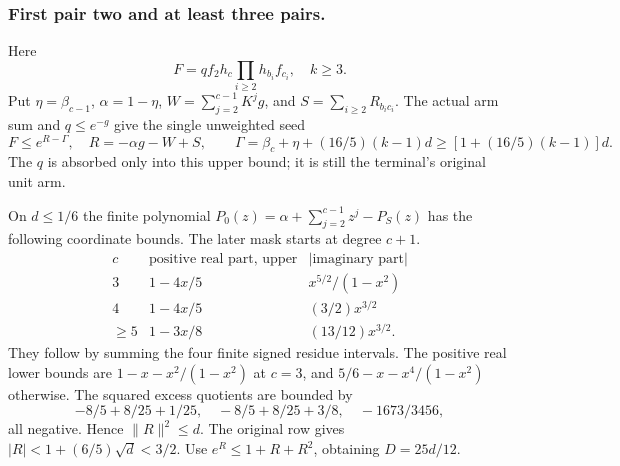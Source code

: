 \subsubsection{First pair two and at least three pairs.}\label{part:unit-p:two-many}
Here
\[
 F=qf_2h_c\prod_{i\ge2}h_{b_i}f_{c_i},\quad k\ge3.
\]
Put \(\eta=\beta_{c-1}\), \(\alpha=1-\eta\),
\(W=\sum_{j=2}^{c-1}K^jg\), and \(S=\sum_{i\ge2}R_{b_ic_i}\).
The actual arm sum and \(q\le e^{-g}\) give the single unweighted seed
\begin{equation}\label{eq:unit-p:data-18}
F\le e^{R-\Gamma},\quad R=-\alpha g-W+S,\qquad
 \Gamma=\beta_c+\eta+(16/5)(k-1)d
        \ge[1+(16/5)(k-1)]d .
\end{equation}
The \(q\) is absorbed only into this upper bound; it is still the
terminal's original unit arm.

On \(d\le1/6\) the finite polynomial
\(P_0(z)=\alpha+\sum_{j=2}^{c-1}z^j-P_S(z)\)
has the following coordinate bounds. The later mask starts at
degree \(c+1\).
\begin{equation}\label{eq:unit-p:data-19}
\begin{array}{c|c|c}
 c&\text{positive real part, upper}&
                    |\text{imaginary part}|\\\hline
 3&1-4x/5&x^{5/2}/(1-x^2)\\
 4&1-4x/5&(3/2)x^{3/2}\\
 \ge5&1-3x/8&(13/12)x^{3/2}.
\end{array}
\end{equation}
They follow by summing the four finite signed residue intervals.
The positive real lower bounds are
\(1-x-x^2/(1-x^2)\) at \(c=3\), and
\(5/6-x-x^4/(1-x^2)\) otherwise. The squared excess quotients
are bounded by
\[
 -8/5+8/25+1/25,\quad
 -8/5+8/25+3/8,\quad -1673/3456 ,
\]
all negative. Hence \(\|R\|^2\le d\).
The original row gives
\(|R|<1+(6/5)\sqrt d<3/2\).
Use \(e^R\le1+R+R^2\), obtaining \(D=25d/12\).

